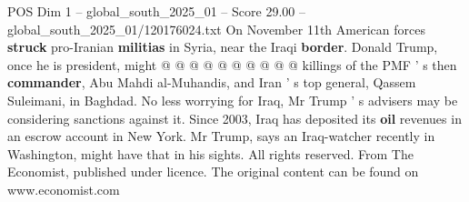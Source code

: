 \begin{textsample}{POS Dim 1 – global\_south\_2025\_01 – Score 29.00 – global\_south\_2025\_01/120176024.txt}
On November 11th American forces \textbf{struck} pro-Iranian \textbf{militias} in Syria, near the Iraqi \textbf{border}.
Donald Trump, once he is president, might @ @ @ @ @ @ @ @ @ @ killings of the PMF ' s then \textbf{commander}, Abu Mahdi al-Muhandis, and Iran ' s top general, Qassem Suleimani, in Baghdad.
No less worrying for Iraq, Mr Trump ' s advisers may be considering sanctions against it.
Since 2003, Iraq has deposited its \textbf{oil} revenues in an escrow account in New York.
Mr Trump, says an Iraq-watcher recently in Washington, might have that in his sights.
All rights reserved.
From The Economist, published under licence.
The original content can be found on www.economist.com

\end{textsample}
